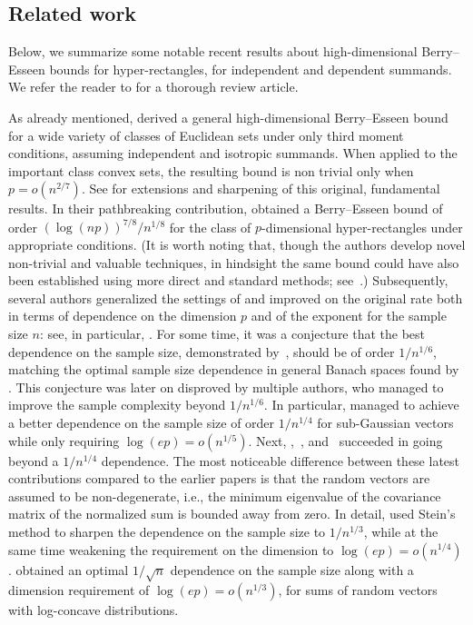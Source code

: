 \documentclass[aos]{imsart}
\begin{document}
\subsection{Related work}\label{sec:literature}
Below, we summarize some notable recent results about high-dimensional Berry--Esseen bounds for hyper-rectangles, for independent and dependent summands. We refer the reader to \cite{chernozhukov2023high} for a thorough review article.

As already mentioned, \cite{bentkus03} derived a general high-dimensional Berry--Esseen bound for a wide variety of classes of Euclidean sets under only third moment conditions, assuming independent and isotropic summands. When applied to the important class convex sets, the resulting bound is non trivial only when $p = o( n^{2/7})$. See \cite{bentkus2005lyapunov, raic2019, fang2021high, zhilova_22} for extensions and sharpening of this original, fundamental results. In their pathbreaking contribution, \cite{chernozhukov2013gaussian}  obtained a Berry--Esseen bound of order $(\log(np))^{7/8} / n^{1/8}$ for the class of $p$-dimensional hyper-rectangles under appropriate conditions. (It is worth noting that, though the authors develop novel non-trivial and valuable techniques, in hindsight the same bound could have also been established using more direct and standard methods; see~\citet{MR1115160}.) 
Subsequently, several authors generalized the settings of \citet{chernozhukov2013gaussian} and improved on the original rate  both in terms of dependence on the dimension $p$ and of the exponent for the sample size $n$: see, in particular, \citet{chernozhukov2017central,koike2019high,koike2019notes,deng2020beyond,kuchibhotla2021high}. For some time, it was a conjecture that the best dependence on the sample size, demonstrated by~\citet{chernozhukov2017central}, should be of order $1/n^{1/6}$, matching  the optimal sample size dependence in general Banach spaces found  by \citet{bentkus1987}. This conjecture was later on disproved by multiple authors, who managed to improve the sample complexity beyond $1/n^{1/6}$. In particular, \cite{chernozhukov2019improved} managed to achieve a better dependence on the sample size of order $1/n^{1/4}$ for sub-Gaussian vectors while only requiring $\log(ep) = o(n^{1/5})$. Next, \cite{fang2021high},~\cite{das2020central}, and~\cite{lopes2020central} succeeded in going beyond a $1/n^{1/4}$ dependence.  The most noticeable difference between these latest contributions compared to the earlier papers is that the random vectors are assumed to be non-degenerate, i.e., the minimum eigenvalue of the covariance matrix of the normalized sum is bounded away from zero.  In detail, \citet[Corollary 1.3]{fang2021high} used Stein's method to sharpen the dependence on the sample size to $1/n^{1/3}$, while at the same time  weakening the requirement on the dimension to $\log(ep) = o(n^{1/4})$. \citet[Corollary 1.1]{fang2021high} obtained an optimal $1/\sqrt{n}$ dependence on the sample size along with a dimension requirement of $\log(ep) = o(n^{1/3})$, for sums of random vectors with log-concave distributions. 
\end{document}
